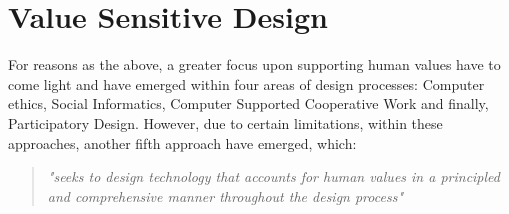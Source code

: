 
\section{Value Sensitive Design}
\label{subsec:vsd_framework}
For reasons as the above, a greater focus upon supporting human values have to come light and have emerged within four areas of design processes: Computer ethics, Social Informatics, Computer Supported Cooperative Work and finally, Participatory Design\citep[p. 3]{FriedmanVSDandIS}. However, due to certain limitations, within these approaches, another fifth approach have emerged, which: 
\begin{quotation}
\textit{"seeks to design technology that accounts for human values in a principled and comprehensive manner throughout the design process"} \citep[p. 1186]{HumanValuesEthicsAndDesign}
\end{quotation}

